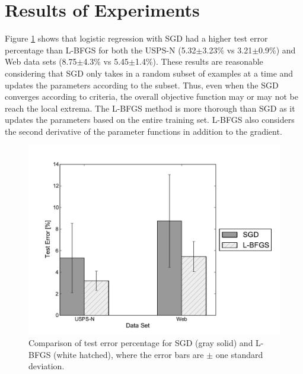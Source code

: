 \documentclass[10pt]{article}
\begin{document}
\section{Results of Experiments}
\label{sec:results}

Figure \ref{fig:test_error} shows that logistic regression with SGD had a higher test error percentage than L-BFGS for both the USPS-N (5.32$\pm$3.23\% vs 3.21$\pm$0.9\%) and Web data sets (8.75$\pm$4.3\% vs 5.45$\pm$1.4\%). These results are reasonable considering that SGD only takes in a random subset of examples at a time and updates the parameters according to the subset. Thus, even when the SGD converges according to criteria, the overall objective function may or may not be reach the local extrema. The L-BFGS method is more thorough than SGD as it updates the parameters based on the entire training set. L-BFGS also considers the second derivative of the parameter functions in addition to the gradient.   

\begin{figure}[h]
\begin{center}
    \includegraphics[width=1.0\textwidth]{test_error.pdf}
    \caption{Comparison of test error percentage for SGD (gray solid) and L-BFGS (white hatched), where the error bars are $\pm$ one standard deviation.}
    \label{fig:test_error}
\end{center}
\end{figure}
\end{document}
